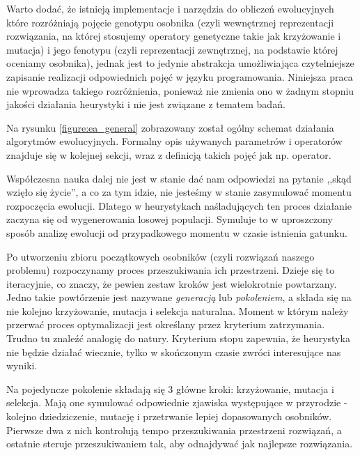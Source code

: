 \documentclass[./FM_mgr.tex]{subfiles}
\begin{document}
Warto dodać, że istnieją implementacje i narzędzia do obliczeń ewolucyjnych które rozróżniają pojęcie genotypu osobnika (czyli wewnętrznej reprezentacji rozwiązania, na której stosujemy operatory genetyczne takie jak krzyżowanie i mutacja) i jego fenotypu (czyli reprezentacji zewnętrznej, na podstawie której oceniamy osobnika), jednak jest to jedynie abstrakcja umożliwiająca czytelniejsze zapisanie realizacji odpowiednich pojęć w języku programowania. Niniejsza praca nie wprowadza takiego rozróżnienia, ponieważ nie zmienia ono w żadnym stopniu jakości działania heurystyki i nie jest związane z tematem badań.

Na rysunku \ref{figure:ea_general} zobrazowany został ogólny schemat działania algorytmów ewolucyjnych. Formalny opis używanych parametrów i operatorów znajduje się w kolejnej sekcji, wraz z definicją takich pojęć jak np. operator.




Współczesna nauka dalej nie jest w stanie dać nam odpowiedzi na pytanie ,,skąd wzięło się życie'', a co za tym idzie, nie jesteśmy w stanie zasymulować momentu rozpoczęcia ewolucji.
Dlatego w heurystykach naśladujących ten proces działanie zaczyna się od wygenerowania losowej populacji. 
Symuluje to w uproszczony sposób analizę ewolucji od przypadkowego momentu w czasie istnienia gatunku.

Po utworzeniu zbioru początkowych osobników (czyli rozwiązań naszego problemu) rozpoczynamy proces przeszukiwania ich przestrzeni.
Dzieje się to iteracyjnie, co znaczy, że pewien zestaw kroków jest wielokrotnie powtarzany.
Jedno takie powtórzenie jest nazywane \emph{generacją} lub \emph{pokoleniem}, a składa się na nie kolejno krzyżowanie, mutacja i selekcja naturalna.
Moment w którym należy przerwać proces optymalizacji jest określany przez kryterium zatrzymania. 
Trudno tu znaleźć analogię do natury.
Kryterium stopu zapewnia, że heurystyka nie będzie działać wiecznie, tylko w skończonym czasie zwróci interesujące nas wyniki.

Na pojedyncze pokolenie składają się 3 główne kroki: krzyżowanie, mutacja i selekcja. 
Mają one symulować odpowiednie zjawiska występujące w przyrodzie - kolejno dziedziczenie, mutację i przetrwanie lepiej dopasowanych osobników.
Pierwsze dwa z nich kontrolują tempo przeszukiwania przestrzeni rozwiązań, a ostatnie steruje przeszukiwaniem tak, aby odnajdywać jak najlepsze rozwiązania. 
\end{document}

